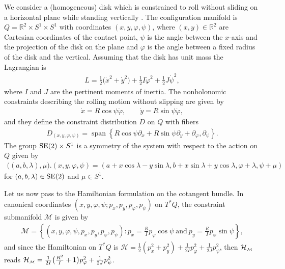 \documentclass[10pt,a4paper]{amsart}
\numberwithin{equation}{section}
\def\M{\mathcal{M}}
\def\Ham{\mathcal{H}}
\def\R{\mathbb{R}}
\def\subM{{\mbox{\tiny{$\M$}}}}
\begin{document}
We consider a (homogeneous) disk which is constrained to roll without sliding on a horizontal
plane while standing vertically \cite{BKMM, FSG2008, NF, Pars}.
The conf\/iguration manifold is $Q = \R^2\times S^1\times S^1$ with coordinates $(x,y,\varphi,\psi)$,
where $(x,y)\in \R^2$ are Cartesian coordinates of the contact point,
$\psi$ is the angle between the $x$-axis and the projection of the disk on the plane and $\varphi$
is the angle between a f\/ixed radius of the disk and the vertical. Assuming that the
disk has unit mass the Lagrangian is
\begin{gather*}
  L = \frac{1}{2} \big(\dot x^2+\dot y^2\big) +\frac{1}{2 } I \dot \varphi^2 + \frac{1}{2 } J \dot\psi^2,
\end{gather*}
where $I$ and $J$ are the pertinent moments of inertia.
The nonholonomic constraints describing the rolling motion without slipping are given by
\begin{gather*}
     \dot x = R \cos\psi  \dot\varphi, \qquad
     \dot y = R \sin\psi  \dot\varphi,
 \end{gather*}
and they def\/ine the constraint distribution $D$ on $Q$ with f\/ibers
\begin{gather*}
 D_{(x,y,\varphi, \psi)} = \operatorname{span} \left\{ R \cos\psi  \partial_x + R\sin\psi   \partial_y+ \partial_\varphi, \partial_\psi  \right\} .
\end{gather*}
The group ${\rm SE}(2)\times S^1$ is a symmetry of the system with respect to the action on $Q$ given by
\begin{gather*}
  \big((a,b,\lambda),\mu \big).(x,y,\varphi,\psi) = (a+x\cos \lambda- y\sin\lambda,
  b+ x\sin\lambda+y\cos\lambda,\varphi+\lambda,\psi+\mu)
\end{gather*}
for $(a,b,\lambda)\in {\rm SE}(2)$ and $\mu\in S^1$.

Let us now pass to the Hamiltonian formulation on the cotangent bundle. In  canonical coordinates $(x,y,\varphi, \psi ;p_x,p_y,p_\varphi,p_\psi)$ on $T^*Q$,
the constraint submanifold $\M$ is given by
\begin{gather*}
\M = \left\{(x,y,\varphi,\psi,p_x,p_y,p_\varphi,p_\psi)\colon
p_x = \frac{R}{I} p_\varphi \cos\psi \ \textrm{and} \ p_y = \frac{R}{I} p_\varphi \sin\psi \right\}   ,
\end{gather*}
and since  the Hamiltonian on $T^*Q$ is
$\Ham = \frac{1}{2} (p_x^2+p_y^2) +\frac{1}{2 I} p_\varphi^2 + \frac{1}{2 J} p^2_\psi$, then $\Ham_\subM$ reads
$\Ham_\subM = \frac{1}{2 I} \big( \frac{R^2}{I} +1\big) p_\varphi^2 + \frac{1}{2 J} p^2_\psi$.
\end{document}
